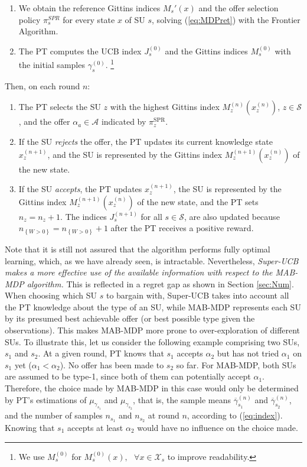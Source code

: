 \begin{enumerate}
\item We obtain the reference Gittins indices $M_s'(x)$ and the offer selection policy $\pi_{s}^{SPR}$ for every state $x$ of SU $s$, solving (\ref{eq:MDPret}) with the Frontier Algorithm.
\item The PT computes the UCB index $J_s^{(0)}$ and the Gittins indices $M_s^{(0)}$ with the initial samples $\gamma_s^{(0)}$. \footnote{We use $M_s^{(0)}$ for $M_s^{(0)}(x), \text{ } \forall x \in \mathcal{X}_s$ to improve readability.}
\setcounter{enumTempB}{\theenumi}
\end{enumerate}
Then, on each round $n$:
\begin{enumerate}
\setcounter{enumi}{\theenumTempB}
\item The PT selects the SU $z$ with the highest Gittins index $M_z^{(n)}(x_z^{(n)})$, $z \in \mathcal{S}$, and the offer $\alpha_a \in \mathcal{A}$ indicated by $\pi_{z}^\text{SPR}$.
\item If the SU \textit{rejects} the offer, the PT updates its current knowledge state $x_z^{(n+1)}$, and the SU is represented by the Gittins index $M_z^{(n+1)}(x_z^{(n)})$ of the new state.
\item If the SU \textit{accepts}, the PT updates $x_z^{(n+1)}$, the SU is represented by the Gittins index $M_z^{(n+1)}(x_z^{(n)})$ of the new state, and the PT sets $n_{z}=n_{z}+1$. The indices $J_{s}^{(n+1)}$ for all $s\in\mathcal{S}$, are also updated because $n_{\left\{W>0\right\}}  = n_{\left\{W>0\right\}}+1$ after the PT receives a positive reward.
\end{enumerate}

Note that it is still not assured that the algorithm performs fully optimal learning, which, as we have already seen, is intractable.
Nevertheless, \textit{Super-UCB makes a more effective use of the available information with respect to the MAB-MDP algorithm.} This is reflected in a regret gap as shown in Section \ref{sec:Num}. When choosing which SU $s$ to bargain with, Super-UCB takes into account all the PT knowledge about the type of an SU, while MAB-MDP represents each SU by its presumed best achievable offer (or best possible type given the observations). This makes MAB-MDP more prone to over-exploration of different SUs. To illustrate this, let us consider the following example comprising two SUs, $s_1$ and $s_2$. At a given round, PT knows that $s_1$ accepts $\alpha_2$ but has not tried $\alpha_1$ on $s_1$ yet ($\alpha_1 < \alpha_2$). No offer has been made to $s_2$ so far. For MAB-MDP, both SUs are assumed to be type-1, since both of them can potentially accept $\alpha_1$. Therefore, the choice made by MAB-MDP in this case would only be determined by PT's estimations of $\mu_{\gamma_{s_1}}$ and $\mu_{\gamma_{s_2}}$, that is, the sample means $\overline\gamma_{s_1}^{(n)}$ and $\overline\gamma_{s_2}^{(n)}$, and the number of samples $n_{s_1}$ and $n_{s_2}$ at round $n$, according to (\ref{eq:index}). Knowing that $s_1$ accepts at least $\alpha_2$ would have no influence on the choice made.

